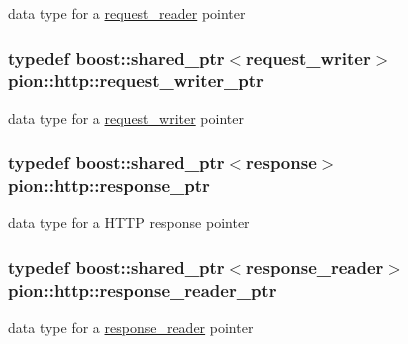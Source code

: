 data type for a \hyperlink{classpion_1_1http_1_1request__reader}{request\-\_\-reader} pointer 

\hypertarget{namespacepion_1_1http_afe361f478f250aac9900197f37176428}{
\subsubsection[{request\-\_\-writer\-\_\-ptr}]{\setlength{\rightskip}{0pt plus 5cm}typedef boost\-::shared\-\_\-ptr$<${\bf request\-\_\-writer}$>$ {\bf pion\-::http\-::request\-\_\-writer\-\_\-ptr}}}\label{namespacepion_1_1http_afe361f478f250aac9900197f37176428}


data type for a \hyperlink{classpion_1_1http_1_1request__writer}{request\-\_\-writer} pointer 

\hypertarget{namespacepion_1_1http_af92bc593f2514fe8733175dafec7cd33}{
\subsubsection[{response\-\_\-ptr}]{\setlength{\rightskip}{0pt plus 5cm}typedef boost\-::shared\-\_\-ptr$<${\bf response}$>$ {\bf pion\-::http\-::response\-\_\-ptr}}}\label{namespacepion_1_1http_af92bc593f2514fe8733175dafec7cd33}


data type for a H\-T\-T\-P response pointer 

\hypertarget{namespacepion_1_1http_a4110534305b5ec05fdfee095c10af4e7}{
\subsubsection[{response\-\_\-reader\-\_\-ptr}]{\setlength{\rightskip}{0pt plus 5cm}typedef boost\-::shared\-\_\-ptr$<${\bf response\-\_\-reader}$>$ {\bf pion\-::http\-::response\-\_\-reader\-\_\-ptr}}}\label{namespacepion_1_1http_a4110534305b5ec05fdfee095c10af4e7}


data type for a \hyperlink{classpion_1_1http_1_1response__reader}{response\-\_\-reader} pointer 

